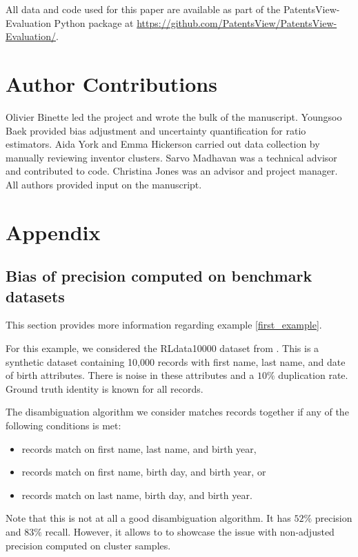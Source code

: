 \documentclass[fontsize=11pt]{article}
\theoremstyle{definition}
\begin{document}
All data and code used for this paper are available as part of the PatentsView-Evaluation Python package at \hyperref[https://github.com/PatentsView/PatentsView-Evaluation/]{https://github.com/PatentsView/PatentsView-Evaluation/}.


\section*{Author Contributions}

Olivier Binette led the project and wrote the bulk of the manuscript. Youngsoo Baek provided bias adjustment and uncertainty quantification for ratio estimators. Aida York and Emma Hickerson carried out data collection by manually reviewing inventor clusters. Sarvo Madhavan was a technical advisor and contributed to code. Christina Jones was an advisor and project manager. All authors provided input on the manuscript.





\appendix

\section{Appendix}\label{sec:appendix}

\subsection{Bias of precision computed on benchmark datasets}\label{appendix:example}

This section provides more information regarding example \ref{first_example}.

For this example, we considered the RLdata10000 dataset from \citep{}. This is a synthetic dataset containing 10,000 records with first name, last name, and date of birth attributes. There is noise in these attributes and a $10\%$ duplication rate. Ground truth identity is known for all records.

The disambiguation algorithm we consider matches records together if any of the following conditions is met:
\begin{itemize}
    \item records match on first name, last name, and birth year,
    \item records match on first name, birth day, and birth year, or
    \item records match on last name, birth day, and birth year.
\end{itemize}
Note that this is not at all a good disambiguation algorithm. It has $52\%$ precision and $83\%$ recall. However, it allows to to showcase the issue with non-adjusted precision computed on cluster samples.
\end{document}
